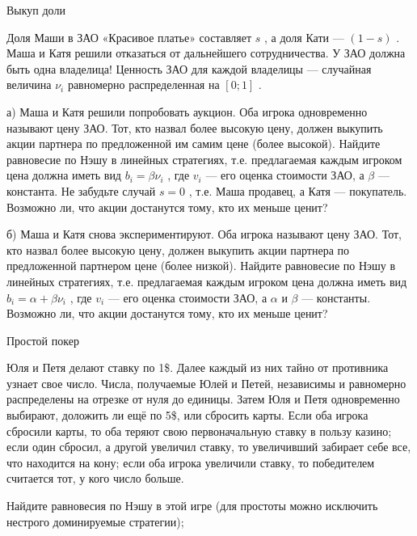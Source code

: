 \begin{problem}
 Выкуп доли\par
Доля Маши в ЗАО «Красивое платье» составляет  $s$ , а доля Кати —  $\left(1-s\right)$ . Маша и Катя решили отказаться от дальнейшего сотрудничества. У ЗАО должна быть одна владелица!
Ценность ЗАО для каждой владелицы — случайная величина  $\nu _{i} $  равномерно распределенная на  $\left[0;1\right]$ .\par
а)	Маша и Катя решили попробовать аукцион. Оба игрока одновременно называют цену ЗАО. Тот, кто назвал более высокую цену, должен выкупить акции партнера по предложенной им самим цене (более высокой). Найдите равновесие по Нэшу в линейных стратегиях, т.е. предлагаемая каждым игроком цена должна иметь вид  $b_{i} =\beta \nu _{i} $ , где  $v_{i} $  — его оценка стоимости ЗАО, а   $\beta $  — константа. Не забудьте случай  $s=0$ , т.е. Маша продавец, а Катя — покупатель. Возможно ли, что акции достанутся тому, кто их меньше ценит?\par
б)	Маша и Катя снова экспериментируют. Оба игрока называют цену ЗАО. Тот, кто назвал более высокую цену, должен выкупить акции партнера по предложенной партнером цене (более низкой). Найдите равновесие по Нэшу в линейных стратегиях, т.е. предлагаемая каждым игроком цена должна иметь вид  $b_{i} =\alpha +\beta \nu _{i} $ , где  $v_{i} $  — его оценка стоимости ЗАО, а  $\alpha $  и  $\beta $  — константы. Возможно ли, что акции достанутся тому, кто их меньше ценит?\par



\begin{sol}

\end{sol}
\end{problem}



\begin{problem}
 Простой покер\par
Юля и Петя делают ставку по 1\$. Далее каждый из них тайно от противника узнает свое число. Числа, получаемые Юлей и Петей, независимы и равномерно распределены на отрезке от нуля до единицы. Затем Юля и Петя одновременно выбирают, доложить ли ещё по 5\$, или сбросить карты. Если оба игрока сбросили карты, то оба теряют свою первоначальную ставку в пользу казино; если один сбросил, а другой увеличил ставку, то увеличивший забирает себе все, что находится на кону; если оба игрока увеличили ставку, то победителем считается тот, у кого число больше.\par
Найдите равновесия по Нэшу в этой игре (для простоты можно исключить нестрого доминируемые стратегии);\par



\begin{sol}

\end{sol}
\end{problem}



